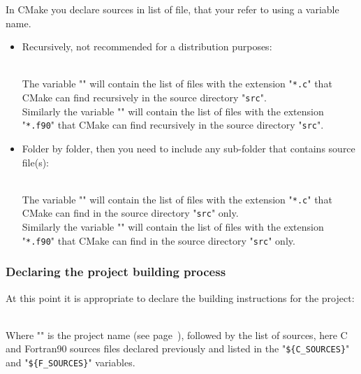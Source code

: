 In CMake you declare sources in list of file, that your refer to using a variable name.
\begin{itemize}
\item Recursively, not recommended for a distribution purposes:
{\footnotesize{
\begin{scripti}
\end{scripti}
}} \\[-0.5cm]
\noindent The variable "" will contain the list of files with the extension "\texttt{*.c}" that CMake can find recursively in the source directory "\texttt{src}". \\
Similarly the variable "" will contain the list of files with the extension "\texttt{*.f90}" that CMake can find recursively in the source directory "\texttt{src}".
\item Folder by folder, then you need to include any sub-folder that contains source file(s):
{\footnotesize{
\begin{scripti}
\end{scripti}
}} \\[-0.5cm]
\noindent The variable "" will contain the list of files with the extension "\texttt{*.c}" that CMake can find in the source directory "\texttt{src}" only. \\
Similarly the variable "" will contain the list of files with the extension "\texttt{*.f90}" that CMake can find in the source directory "\texttt{src}" only. 
\end{itemize}

\subsubsection*{Declaring the project building process}

At this point it is appropriate to declare the building instructions for the project: 
\begin{script}
\end{script}
\\[-0.25cm]
\noindent Where "" is the project name (see page~\pageref{cmake_pname}), followed by the list of sources, here C and Fortran90 sources files declared previously and listed in the "\texttt{\$\{C\_SOURCES\}}" and "\texttt{\$\{F\_SOURCES\}}" variables. 


